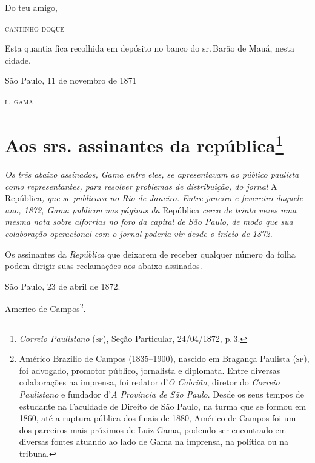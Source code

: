 \begin{flushright}
Do teu amigo,

\textsc{cantinho doque}
\end{flushright}

\asterisc

Esta quantia fica recolhida em depósito no banco do sr.\,Barão de Mauá,
nesta cidade.

\begin{flushright}
São Paulo, 11 de novembro de 1871

\textsc{l. gama}
\end{flushright}

\chapter{Aos srs. assinantes da república\footnote{\emph{Correio Paulistano} (\textsc{sp}), Seção Particular,
  24/04/1872, p.\,3.}} %

\begin{didascalia}
\emph{Os três abaixo assinados, Gama entre eles, se apresentavam ao
público paulista como representantes, para resolver problemas de
distribuição, do jornal} A República\emph{, que se publicava no Rio de
Janeiro. Entre janeiro e fevereiro daquele ano, 1872, Gama publicou nas
páginas da} República \emph{cerca de trinta vezes uma mesma nota sobre
alforrias no foro da capital de São Paulo, de modo que sua colaboração
operacional com o jornal poderia vir desde o início de 1872.}
\end{didascalia}


Os assinantes da \emph{República} que deixarem de receber qualquer
número da folha podem dirigir suas reclamações aos abaixo assinados.

São Paulo, 23 de abril de 1872.

Americo de Campos\footnote{ Américo Brazilio de Campos (1835--1900),
  nascido em Bragança Paulista (\textsc{sp}), foi advogado, promotor público,
  jornalista e diplomata. Entre diversas colaborações na imprensa, foi
  redator d'\emph{O Cabrião}, diretor do \emph{Correio Paulistano} e
  fundador d'\emph{A Província de São Paulo}. Desde os seus tempos de
  estudante na Faculdade de Direito de São Paulo, na turma que se formou
  em 1860, até a ruptura pública dos finais de 1880, Américo de Campos
  foi um dos parceiros mais próximos de Luiz Gama, podendo ser
  encontrado em diversas fontes atuando ao lado de Gama na imprensa, na
  política ou na tribuna.}.

